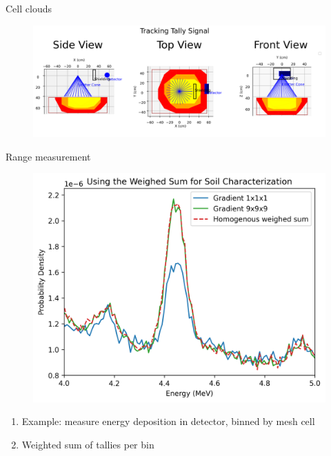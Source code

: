 \documentclass[10pt,hyperref={colorlinks,citecolor=blue,urlcolor=peking_blue,linkcolor=}]{beamer}
\theoremstyle{plain}
\begin{document}
\begin{frame}{Cell clouds}
\begin{figure}[Cell Clouds]
\begin{center}
\includegraphics[width=1\linewidth]{../Figures/MCNP/CellClouds.png}
\end{center}
\end{figure}
\end{frame}
\begin{frame}{Range measurement}
\begin{figure}[Gradient Weighed Avg vs Homogeneous Avg]
\begin{center}
\includegraphics[width=1\linewidth]{../Figures/MCNP/GradientWeighedAvgvsHomogeneousAvg.png}
\end{center}
\end{figure}
\begin{enumerate}
\item Example: measure energy deposition in detector, binned by mesh cell
\item Weighted sum of tallies per bin
\end{enumerate}
\end{frame}
\end{document}
